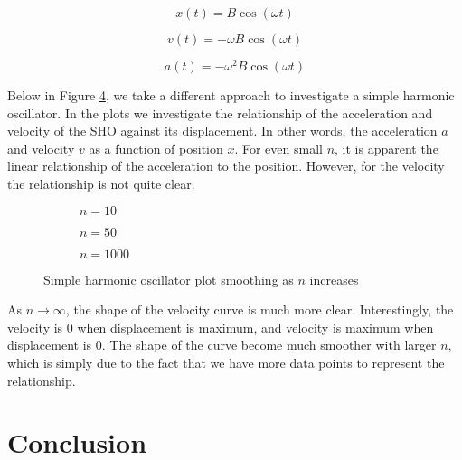 \documentclass{article}
\begin{document}
\begin{equation} \label{eq:2}
x(t)=B\cos(\omega t)
\end{equation}

\begin{equation} \label{eq:3}
v(t)=-\omega B\cos(\omega t)
\end{equation}

\begin{equation} \label{eq:4}
a(t)=-\omega^2 B\cos(\omega t)
\end{equation}

Below in Figure \ref{fig:sho}, we take a different approach to investigate a simple harmonic
oscillator. In the plots we investigate the relationship of the acceleration and velocity of
the SHO against its displacement. In other words, the acceleration $a$  and velocity $v$ as a function
of position $x$. For even small $n$, it is apparent the linear relationship of the acceleration to
the position. However, for the velocity the relationship is not quite clear.

\begin{figure}[H]
    \centering
    \begin{subfigure}[b]{0.35\textwidth}
        \scalebox{.8}{}
        \caption{$n=10$}
        \label{fig:sho10}
    \end{subfigure}
    \begin{subfigure}[b]{0.35\textwidth}
        \scalebox{.8}{}
        \caption{$n=50$}
        \label{fig:sho50}
    \end{subfigure}
    \begin{subfigure}[b]{0.3\textwidth}
        \scalebox{.8}{}
        \caption{$n=1000$}
        \label{fig:sho1000}
    \end{subfigure}
    \caption{Simple harmonic oscillator plot smoothing as $n$ increases}\label{fig:sho}
\end{figure}

As $n \to \infty$, the shape of the velocity curve is much more clear. Interestingly, the
velocity is $0$ when displacement is maximum, and velocity is maximum when displacement is
$0$. The shape of the curve become much smoother with larger $n$, which is simply due to
the fact that we have more data points to represent the relationship.

\section{Conclusion}
\end{document}
